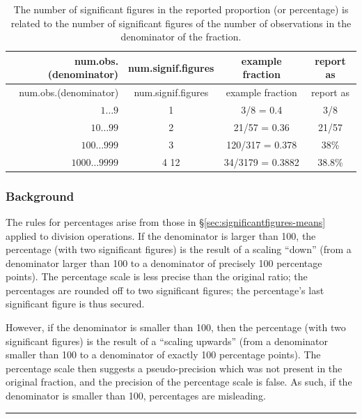 \documentclass[
]{book}
\begin{document}
\begin{longtable}[]{@{}rccc@{}}
\caption{\label{tab:signiffigurepercentage} The number of significant figures in the reported
proportion (or percentage) is related to the number of significant figures of the number
of observations in the denominator of the fraction.}\tabularnewline
\toprule\noalign{}
num.obs.(denominator) & num.signif.figures & example fraction & report as \\
\midrule\noalign{}
\endfirsthead
\toprule\noalign{}
num.obs.(denominator) & num.signif.figures & example fraction & report as \\
\midrule\noalign{}
\endhead
\bottomrule\noalign{}
\endlastfoot
\(1\dots9\) & 1 & 3/8 = 0.4 & 3/8 \\
\(10\dots99\) & 2 & 21/57 = 0.36 & 21/57 \\
\(100\dots999\) & 3 & 120/317 = 0.378 & 38\% \\
\(1000\dots9999\) & 4 12 & 34/3179 = 0.3882 & 38.8\% \\
\end{longtable}

\subsubsection{Background}\label{background-1}

The rules for percentages arise from those in
§\ref{sec:significantfigures-means} applied to division operations.
If the denominator is larger than 100, the percentage (with two significant
figures) is the result of a scaling ``down'' (from a denominator
larger than 100 to a denominator of precisely 100 percentage points).
The percentage scale is less precise than the original
ratio; the percentages are rounded off to two significant figures;
the percentage's last significant figure is thus secured.

However, if the denominator is smaller than 100, then the percentage (with
two significant figures) is the result of a ``scaling upwards'' (from a denominator
smaller than 100 to a denominator of exactly 100 percentage points). The percentage
scale then suggests a
pseudo-precision which was not present in the original fraction,
and the precision of the percentage scale is false. As such, if the denominator is
smaller than 100, percentages are misleading.

\begin{center}\rule{0.5\linewidth}{0.5pt}\end{center}
\end{document}
